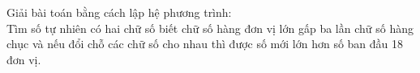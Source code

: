 \begin{ex}%
        Giải bài toán bằng cách lập hệ phương trình:\\
        Tìm số tự nhiên có hai chữ số biết chữ số hàng đơn vị lớn gấp ba lần chữ số hàng chục và nếu đổi chỗ các chữ số cho nhau thì được số mới lớn hơn số ban đầu 18 đơn vị.
\end{ex}        
